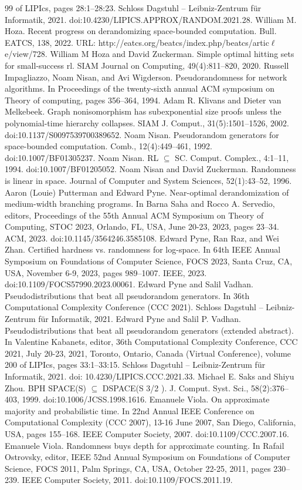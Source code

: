 \documentclass[10pt,a4paper]{article}
\begin{document}
\begin{thebibliography}{99}
 of LIPIcs, pages 28:1–28:23. Schloss Dagstuhl – Leibniz-Zentrum für Informatik, 2021. doi:10.4230/LIPICS.APPROX/RANDOM.2021.28.
 William M. Hoza. Recent progress on derandomizing space-bounded computation. Bull. EATCS, 138, 2022. URL: http://eatcs.org/beatcs/index.php/beatcs/artic$\ell$e/view/728.
 William M Hoza and David Zuckerman. Simple optimal hitting sets for small-success rl. SIAM Journal on Computing, 49(4):811–820, 2020.
 Russell Impagliazzo, Noam Nisan, and Avi Wigderson. Pseudorandomness for network algorithms. In Proceedings of the twenty-sixth annual ACM symposium on Theory of computing, pages 356–364, 1994.
 Adam R. Klivans and Dieter van Melkebeek. Graph nonisomorphism has subexponential size proofs unless the polynomial-time hierarchy collapses. SIAM J. Comput., 31(5):1501–1526, 2002. doi:10.1137/S0097539700389652.
 Noam Nisan. Pseudorandom generators for space-bounded computation. Comb., 12(4):449–461, 1992. doi:10.1007/BF01305237.
 Noam Nisan. RL $\subseteq$ SC. Comput. Complex., 4:1–11, 1994. doi:10.1007/BF01205052.
 Noam Nisan and David Zuckerman. Randomness is linear in space. Journal of Computer and System Sciences, 52(1):43–52, 1996.
 Aaron (Louie) Putterman and Edward Pyne. Near-optimal derandomization of medium-width branching programs. In Barna Saha and Rocco A. Servedio, editors, Proceedings of the 55th Annual ACM Symposium on Theory of Computing, STOC 2023, Orlando, FL, USA, June 20-23, 2023, pages 23–34. ACM, 2023. doi:10.1145/3564246.3585108.
 Edward Pyne, Ran Raz, and Wei Zhan. Certified hardness vs. randomness for log-space. In 64th IEEE Annual Symposium on Foundations of Computer Science, FOCS 2023, Santa Cruz, CA, USA, November 6-9, 2023, pages 989–1007. IEEE, 2023. doi:10.1109/FOCS57990.2023.00061.
 Edward Pyne and Salil Vadhan. Pseudodistributions that beat all pseudorandom generators. In 36th Computational Complexity Conference (CCC 2021). Schloss Dagstuhl – Leibniz-Zentrum für Informatik, 2021.
 Edward Pyne and Salil P. Vadhan. Pseudodistributions that beat all pseudorandom generators (extended abstract). In Valentine Kabanets, editor, 36th Computational Complexity Conference, CCC 2021, July 20-23, 2021, Toronto, Ontario, Canada (Virtual Conference), volume 200 of LIPIcs, pages 33:1–33:15. Schloss Dagstuhl – Leibniz-Zentrum für Informatik, 2021. doi: 10.4230/LIPICS.CCC.2021.33.
 Michael E. Saks and Shiyu Zhou. BPH SPACE(S) $\subseteq$ DSPACE(S 3/2 ). J. Comput. Syst. Sci., 58(2):376–403, 1999. doi:10.1006/JCSS.1998.1616.
 Emanuele Viola. On approximate majority and probabilistic time. In 22nd Annual IEEE Conference on Computational Complexity (CCC 2007), 13-16 June 2007, San Diego, California, USA, pages 155–168. IEEE Computer Society, 2007. doi:10.1109/CCC.2007.16.
 Emanuele Viola. Randomness buys depth for approximate counting. In Rafail Ostrovsky, editor, IEEE 52nd Annual Symposium on Foundations of Computer Science, FOCS 2011, Palm Springs, CA, USA, October 22-25, 2011, pages 230–239. IEEE Computer Society, 2011. doi:10.1109/FOCS.2011.19.
\end{thebibliography}
\end{document}
